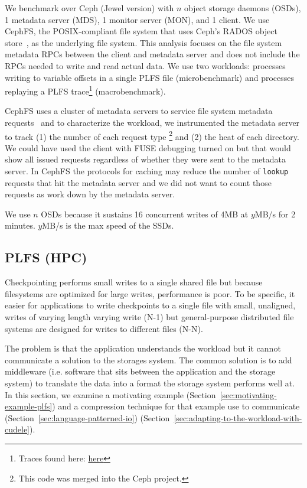 We benchmark over Ceph (Jewel version) with \(n\) object storage daemons
(OSDs), 1 metadata server (MDS), 1 monitor server (MON), and 1 client.  We use
CephFS, the POSIX-compliant file system that uses Ceph's RADOS object
store~\cite{weil:osdi2006-ceph}, as the underlying file system.  This analysis
focuses on the file system metadata RPCs between the client and metadata server
and does not include the RPCs needed to write and read actual data.  We use two
workloads: processes writing to variable offsets in a single PLFS file
(microbenchmark) and processes replaying a PLFS trace\footnote{Traces found
here:
\href{https://web.archive.org/web/20140419194914/http://institutes.lanl.gov/plfs/maps/}{here}}
(macrobenchmark). 

CephFS uses a cluster of metadata servers to service file system metadata
requests~\cite{weil:sc2004-dyn-metadata} and to characterize the workload, we
instrumented the metadata server to track (1) the number of each request type
\footnote{This code was merged into the Ceph project.} and (2) the heat of each
directory.  We could have used the client with FUSE debugging turned on but
that would show all issued requests regardless of whether they were sent to the
metadata server. In CephFS the protocols for caching may reduce the number of
\texttt{lookup} requests that hit the metadata server and we did not want to
count those requests as work down by the metadata server.



We use
\(n\) OSDs because it sustains 16 concurrent writes of 4MB at \(y\)MB/s for 2
minutes. \(y\)MB/s is the max speed of the SSDs.


\subsection{PLFS (HPC)}
\label{sec:plfs}
Checkpointing performs small writes to a single shared file but because
filesystems are optimized for large writes, performance is poor. To be
specific, it easier for applications to write checkpoints to a single file with
small, unaligned, writes of varying length varying write (N-1) but
general-purpose distributed file systems are designed for writes to different
files (N-N).

The problem is that the application understands the workload but it cannot
communicate a solution to the storages system. The common solution is to add
middleware (i.e. software that sits between the application and the storage
system) to translate the data into a format the storage system performs well
at. In this section, we examine a motivating example
(Section~\ref{sec:motivating-example-plfs}) and a compression technique for that example
use to communicate (Section~\ref{sec:language-patterned-io})
(Section~\ref{sec:adapting-to-the-workload-with-cudele}).  

